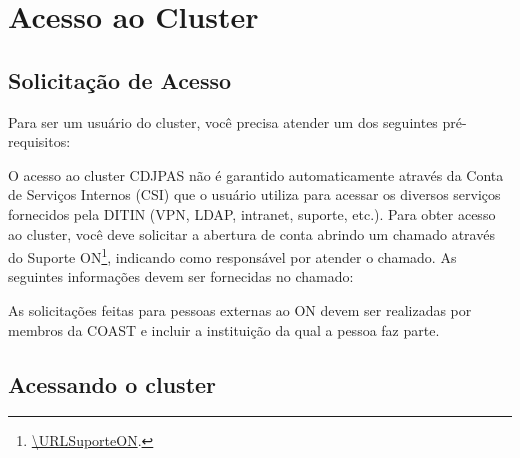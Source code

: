 \chapter{Acesso ao Cluster}
\label{chap:acesso-ao-cluster}

\section{Solicitação de Acesso}
\label{sec:solicitacao-de-acesso}

Para ser um usuário do cluster, você precisa atender um dos seguintes pré-requisitos:


O acesso ao cluster CDJPAS não é garantido automaticamente através da Conta de Serviços Internos (CSI) que o usuário utiliza para acessar os diversos serviços fornecidos pela DITIN (VPN, LDAP, intranet, suporte, etc.).
Para obter acesso ao cluster, você deve solicitar a abertura de conta abrindo um chamado através do Suporte ON\footnote{\url{\URLSuporteON}.}, indicando \textbf{\cdjpasadmin} como responsável por atender o chamado.
As seguintes informações devem ser fornecidas no chamado:


As solicitações feitas para pessoas externas ao ON devem ser realizadas por membros da COAST e incluir a instituição da qual a pessoa faz parte.



\section{Acessando o cluster}
\label{sec:acessando-o-cluster}

